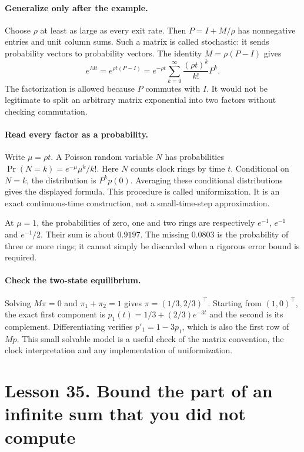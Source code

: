 \paragraph{Generalize only after the example.}
Choose $\rho$ at least as large as every exit rate. Then $P=I+M/\rho$
has nonnegative entries and unit column sums. Such a matrix is called
stochastic: it sends probability vectors to probability vectors. The identity
$M=\rho(P-I)$ gives
\[
 e^{Mt}=e^{\rho t(P-I)}
 =e^{-\rho t}\sum_{k=0}^\infty\frac{(\rho t)^k}{k!}P^k.
\]
The factorization is allowed because $P$ commutes with $I$.
It would not be legitimate to split an arbitrary matrix exponential into
two factors without checking commutation.

\paragraph{Read every factor as a probability.}
Write $\mu=\rho t$. A Poisson random variable $N$ has probabilities
$\Pr(N=k)=e^{-\mu}\mu^k/k!$. Here $N$ counts clock rings by time $t$.
Conditional on $N=k$, the distribution is $P^kp(0)$. Averaging these
conditional distributions gives the displayed formula. This procedure is
called uniformization. It is an exact continuous-time construction, not a
small-time-step approximation.

At $\mu=1$, the probabilities of zero, one and two rings are respectively
$e^{-1}$, $e^{-1}$ and $e^{-1}/2$. Their sum is about $0.9197$.
The missing $0.0803$ is the probability of three or more rings; it cannot
simply be discarded when a rigorous error bound is required.

\paragraph{Check the two-state equilibrium.}
Solving $M\pi=0$ and $\pi_1+\pi_2=1$ gives $\pi=(1/3,2/3)^\top$.
Starting from $(1,0)^\top$, the exact first component is
$p_1(t)=1/3+(2/3)e^{-3t}$ and the second is its complement.
Differentiating verifies $p'_1=1-3p_1$, which is also the first row of
$Mp$. This small solvable model is a useful check of the matrix convention,
the clock interpretation and any implementation of uniformization.

\section*{Lesson 35. Bound the part of an infinite sum that you did not compute}

